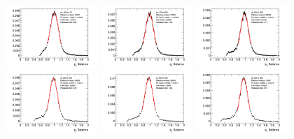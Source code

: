 \begin{figure}[htb!]
    \centering
    \includegraphics[width=0.31\textwidth]{plots/insitu/fits_pythia_zmm_nominal/Zmmjet_Nominal_Bin2.png}
    \includegraphics[width=0.31\textwidth]{plots/insitu/fits_pythia_zmm_nominal/Zmmjet_Nominal_Bin3.png}
    \includegraphics[width=0.31\textwidth]{plots/insitu/fits_pythia_zmm_nominal/Zmmjet_Nominal_Bin4.png}
    \includegraphics[width=0.31\textwidth]{plots/insitu/fits_pythia_zmm_nominal/Zmmjet_Nominal_Bin5.png}
    \includegraphics[width=0.31\textwidth]{plots/insitu/fits_pythia_zmm_nominal/Zmmjet_Nominal_Bin6.png}
    \includegraphics[width=0.31\textwidth]{plots/insitu/fits_pythia_zmm_nominal/Zmmjet_Nominal_Bin7.png}

\end{figure}
